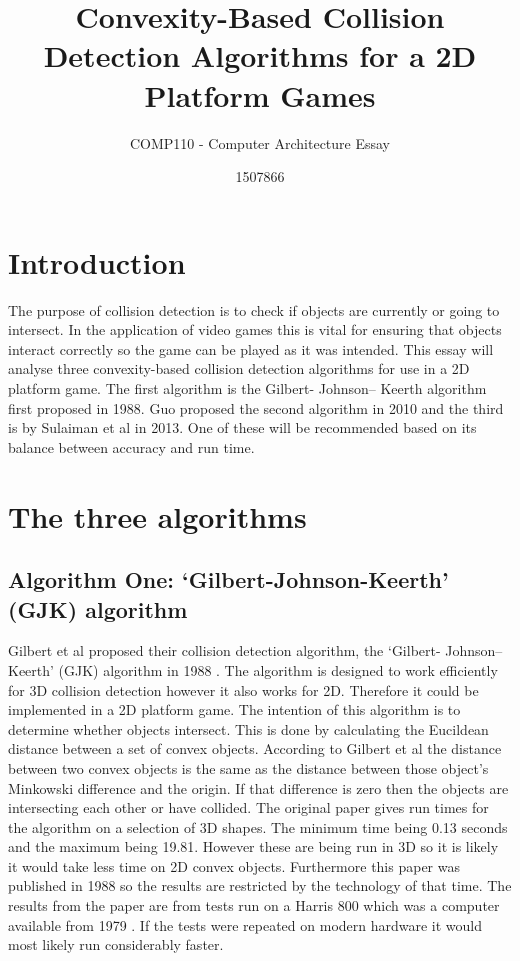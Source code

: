 \documentclass{scrartcl}
\title{Convexity-Based Collision Detection Algorithms for a 2D Platform Games}
\subtitle{COMP110 - Computer Architecture Essay}
\author{1507866}
\begin{document}
	
\maketitle
	
	
\section{Introduction}
	
The purpose of collision detection is to check if objects are currently or going to intersect. In the application of video games this is vital for ensuring that objects interact correctly so the game can be played as it was intended.  This essay will analyse three convexity-based collision detection algorithms for use in a 2D platform game.  The first algorithm is the Gilbert- Johnson– Keerth algorithm first proposed in 1988. Guo proposed the second algorithm in 2010 and the third is by Sulaiman et al in 2013. One of these will be recommended based on its balance between accuracy and run time.

	
\section{The three algorithms}
\subsection{Algorithm One: ‘Gilbert-Johnson-Keerth’ (GJK) algorithm}
Gilbert et al proposed their collision detection algorithm, the ‘Gilbert- Johnson– Keerth’ (GJK) algorithm in 1988 \cite{GJK}. The algorithm is designed to work efficiently for 3D collision detection however it also works for 2D. Therefore it could be implemented in a 2D platform game. The intention of this algorithm is to determine whether objects intersect. This is done by calculating the Eucildean distance between a set of convex objects. According to Gilbert et al the distance between two convex objects is the same as the distance between those object’s Minkowski difference and the origin. If that difference is zero then the objects are intersecting each other or have collided.
\newline 
The original paper gives run times for the algorithm on a selection of 3D shapes. The minimum time being 0.13 seconds and the maximum being 19.81. However these are being run in 3D so it is likely it would take less time on 2D convex objects. Furthermore this paper was published in 1988 so the results are restricted by the technology of that time. The results from the paper are from tests run on a Harris 800 which was a computer available from 1979 \cite{harris800}. If the tests were repeated on modern hardware it would most likely run considerably faster.
\end{document}
